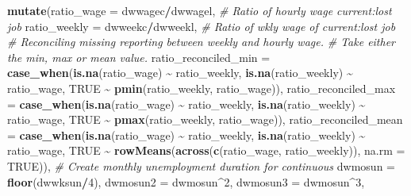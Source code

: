 \documentclass[
]{article}
\newenvironment{Shaded}{\begin{snugshade}}{\end{snugshade}}
\newcommand{\AttributeTok}[1]{\textcolor[rgb]{0.13,0.29,0.53}{#1}}
\newcommand{\CommentTok}[1]{\textcolor[rgb]{0.56,0.35,0.01}{\textit{#1}}}
\newcommand{\ConstantTok}[1]{\textcolor[rgb]{0.56,0.35,0.01}{#1}}
\newcommand{\DecValTok}[1]{\textcolor[rgb]{0.00,0.00,0.81}{#1}}
\newcommand{\FunctionTok}[1]{\textcolor[rgb]{0.13,0.29,0.53}{\textbf{#1}}}
\newcommand{\NormalTok}[1]{#1}
\newcommand{\SpecialCharTok}[1]{\textcolor[rgb]{0.81,0.36,0.00}{\textbf{#1}}}
\begin{document}
\begin{Shaded}
\begin{Highlighting}[]
  \FunctionTok{mutate}\NormalTok{(}\AttributeTok{ratio\_wage =}\NormalTok{ dwwagec}\SpecialCharTok{/}\NormalTok{dwwagel, }\CommentTok{\# Ratio of hourly wage current:lost job}
         \AttributeTok{ratio\_weekly =}\NormalTok{ dwweekc}\SpecialCharTok{/}\NormalTok{dwweekl, }\CommentTok{\# Ratio of wkly wage of current:lost job}
         \CommentTok{\# Reconciling missing reporting between weekly and hourly wage. }
         \CommentTok{\# Take either the min, max or mean value. }
         \AttributeTok{ratio\_reconciled\_min =} \FunctionTok{case\_when}\NormalTok{(}\FunctionTok{is.na}\NormalTok{(ratio\_wage) }\SpecialCharTok{\textasciitilde{}}\NormalTok{ ratio\_weekly, }
                                          \FunctionTok{is.na}\NormalTok{(ratio\_weekly) }\SpecialCharTok{\textasciitilde{}}\NormalTok{ ratio\_wage, }
                                          \ConstantTok{TRUE} \SpecialCharTok{\textasciitilde{}} \FunctionTok{pmin}\NormalTok{(ratio\_weekly, ratio\_wage)), }
         \AttributeTok{ratio\_reconciled\_max =} \FunctionTok{case\_when}\NormalTok{(}\FunctionTok{is.na}\NormalTok{(ratio\_wage) }\SpecialCharTok{\textasciitilde{}}\NormalTok{ ratio\_weekly, }
                                          \FunctionTok{is.na}\NormalTok{(ratio\_weekly) }\SpecialCharTok{\textasciitilde{}}\NormalTok{ ratio\_wage, }
                                          \ConstantTok{TRUE} \SpecialCharTok{\textasciitilde{}} \FunctionTok{pmax}\NormalTok{(ratio\_weekly, ratio\_wage)), }
         \AttributeTok{ratio\_reconciled\_mean =} \FunctionTok{case\_when}\NormalTok{(}\FunctionTok{is.na}\NormalTok{(ratio\_wage) }\SpecialCharTok{\textasciitilde{}}\NormalTok{ ratio\_weekly, }
                                          \FunctionTok{is.na}\NormalTok{(ratio\_weekly) }\SpecialCharTok{\textasciitilde{}}\NormalTok{ ratio\_wage, }
                                          \ConstantTok{TRUE} \SpecialCharTok{\textasciitilde{}} \FunctionTok{rowMeans}\NormalTok{(}\FunctionTok{across}\NormalTok{(}\FunctionTok{c}\NormalTok{(ratio\_wage, }
\NormalTok{                                                                   ratio\_weekly)), }
                                                          \AttributeTok{na.rm =} \ConstantTok{TRUE}\NormalTok{)), }
         \CommentTok{\# Create monthly unemployment duration for continuous}
         \AttributeTok{dwmosun =} \FunctionTok{floor}\NormalTok{(dwwksun}\SpecialCharTok{/}\DecValTok{4}\NormalTok{),}
         \AttributeTok{dwmosun2 =}\NormalTok{ dwmosun}\SpecialCharTok{\^{}}\DecValTok{2}\NormalTok{,}
         \AttributeTok{dwmosun3 =}\NormalTok{ dwmosun}\SpecialCharTok{\^{}}\DecValTok{3}\NormalTok{,}

\end{Highlighting}
\end{Shaded}
\end{document}
